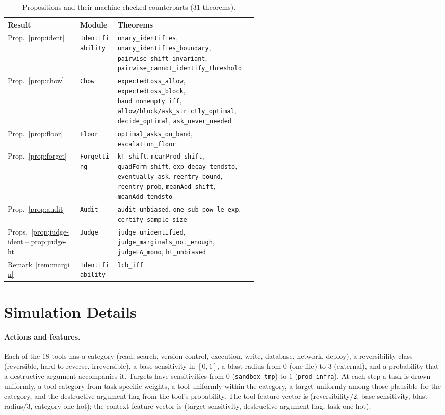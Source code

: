 \documentclass[11pt]{article}
\newcommand{\lean}[1]{\texttt{\footnotesize #1}}
\begin{document}
\begin{table}[h]
\centering
\small
\begin{tabular}{@{}ll>{\raggedright\arraybackslash}p{0.57\linewidth}@{}}
\toprule
\textbf{Result} & \textbf{Module} & \textbf{Theorems} \\
\midrule
Prop.~\ref{prop:ident} & \lean{Identifiability} & \lean{unary\_identifies}, \lean{unary\_identifies\_boundary}, \lean{pairwise\_shift\_invariant}, \lean{pairwise\_cannot\_identify\_threshold} \\
Prop.~\ref{prop:chow} & \lean{Chow} & \lean{expectedLoss\_allow}, \lean{expectedLoss\_block}, \lean{band\_nonempty\_iff}, \lean{allow/block/ask\_strictly\_optimal}, \lean{decide\_optimal}, \lean{ask\_never\_needed} \\
Prop.~\ref{prop:floor} & \lean{Floor} & \lean{optimal\_asks\_on\_band}, \lean{escalation\_floor} \\
Prop.~\ref{prop:forget} & \lean{Forgetting} & \lean{kT\_shift}, \lean{meanProd\_shift}, \lean{quadForm\_shift}, \lean{exp\_decay\_tendsto}, \lean{eventually\_ask}, \lean{reentry\_bound}, \lean{reentry\_prob}, \lean{meanAdd\_shift}, \lean{meanAdd\_tendsto} \\
Prop.~\ref{prop:audit} & \lean{Audit} & \lean{audit\_unbiased}, \lean{one\_sub\_pow\_le\_exp}, \lean{certify\_sample\_size} \\
Props.~\ref{prop:judge-ident}--\ref{prop:judge-ht} & \lean{Judge} & \lean{judge\_unidentified}, \lean{judge\_marginals\_not\_enough}, \lean{judgeFA\_mono}, \lean{ht\_unbiased} \\
Remark~\ref{rem:margin} & \lean{Identifiability} & \lean{lcb\_iff} \\
\bottomrule
\end{tabular}
\caption{Propositions and their machine-checked counterparts (31 theorems).}
\label{tab:lean}
\end{table}

\section{Simulation Details}\label{app:sim}

\paragraph{Actions and features.} Each of the $18$ tools has a category
(read, search, version control, execution, write, database, network, deploy),
a reversibility class (reversible, hard to reverse, irreversible), a base
sensitivity in $[0,1]$, a blast radius from $0$ (one file) to $3$ (external),
and a probability that a destructive argument accompanies it. Targets have
sensitivities from $0$ (\texttt{sandbox\_tmp}) to $1$
(\texttt{prod\_infra}). At each step a task is drawn uniformly, a tool
category from task-specific weights, a tool uniformly within the category, a
target uniformly among those plausible for the category, and the
destructive-argument flag from the tool's probability. The tool feature
vector is (reversibility$/2$, base sensitivity, blast radius$/3$, category
one-hot); the context feature vector is (target sensitivity,
destructive-argument flag, task one-hot).
\end{document}
